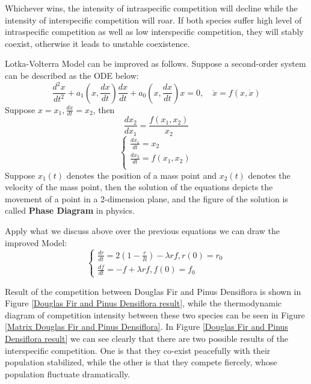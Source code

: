 \documentclass{mcmthesis}
\numberwithin{figure}{section}
\numberwithin{table}{section}
\numberwithin{equation}{section}
\begin{document}
Whichever wins, the intensity of intraspecific competition will decline while the
intensity of interspecific competition will roar. If both species suffer high level of
intraspecific competition as well as low interspecific competition, they will stably
coexist, otherwise it leads to unstable coexistence. 
\par
Lotka-Volterra Model can be improved as follows. Suppose a second-order system can be described as the ODE below:
$$
  \frac{d^2x}{dt^2}+a_1(x,\frac{dx}{dt})\frac{dx}{dt} + a_0(x,\frac{dx}{dt})x = 0, \quad \ddot{x} = f(x,\dot{x})
$$  
Suppose $ x = x_1, \frac{dx}{dt} = x_2 $, then
$$
  \frac{dx_2}{dx_1} = \frac{f(x_1,x_2)}{x_2}
$$ 
$$
\begin{cases}
        \frac{dx_1}{dt} = x_2\\
      \frac{dx_2}{dt} =f(x_1,x_2)\\
\end{cases}
$$ 
Suppose $ x_1(t) $ denotes the position of a mass point and $ x_2(t) $ denotes the velocity of the mass point, then the 
solution of the equations depicts the movement of a point in a 2-dimension plane, and the figure of the solution is called
\textbf{Phase Diagram} in physics.
\par
Apply what we discuss above over the previous equations we can draw the improved Model:
$$
  \begin{cases}
    \frac{dr}{dt} = 2(1-\frac{r}{R})-\lambda rf, r(0) = r_0\\
    \frac{df}{dt} = -f + \lambda rf, f(0) = f_0
  \end{cases}
$$ 
\par
Result of the competition between Douglas Fir and Pinus Densiflora is shown in 
Figure \ref{Douglas Fir and Pinus Densiflora result}, while the thermodynamic diagram
of competition intensity between these two species can be seen in Figure \ref{Matrix Douglas Fir and Pinus Densiflora}.
In Figure \ref{Douglas Fir and Pinus Densiflora result} we can see clearly that 
there are two possible results of the interspecific competition. One is that they co-exist peacefully with their
population stabilized, while the other is that they compete fiercely, whose population fluctuate
dramatically.
\end{document}
